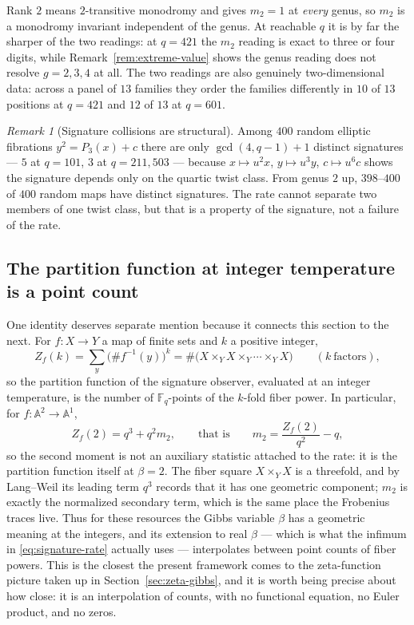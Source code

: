 \documentclass[11pt]{article}
\theoremstyle{definition}
\theoremstyle{plain}
\theoremstyle{remark}
\newtheorem{remark}[definition]{Remark}
\newcommand{\F}{\mathbb F}
\begin{document}
Rank \(2\) means \(2\)-transitive monodromy and gives \(m_2=1\) at
\emph{every} genus, so \(m_2\) is a monodromy invariant independent of the
genus.  At reachable \(q\) it is by far the sharper of the two readings: at
\(q=421\) the \(m_2\) reading is exact to three or four digits, while
Remark~\ref{rem:extreme-value} shows the genus reading does not resolve
\(g=2,3,4\) at all.  The two readings are also genuinely two-dimensional data:
across a panel of \(13\) families they order the families differently in \(10\)
of \(13\) positions at \(q=421\) and \(12\) of \(13\) at \(q=601\).

\begin{remark}[Signature collisions are structural]
Among \(400\) random elliptic fibrations \(y^2=P_3(x)+c\) there are only
\(\gcd(4,q-1)+1\) distinct signatures --- \(5\) at \(q=101\), \(3\) at
\(q=211,503\) --- because \(x\mapsto u^2x\), \(y\mapsto u^3y\),
\(c\mapsto u^6c\) shows the signature depends only on the quartic twist class.
From genus \(2\) up, \(398\)--\(400\) of \(400\) random maps have distinct
signatures.  The rate cannot separate two members of one twist class, but that
is a property of the signature, not a failure of the rate.
\end{remark}

\subsection{The partition function at integer temperature is a point count}
\label{sub:fiber-powers}

One identity deserves separate mention because it connects this section to the
next.  For \(f:X\to Y\) a map of finite sets and \(k\) a positive integer,
\begin{equation}
  Z_f(k)=\sum_{y}\bigl(\#f^{-1}(y)\bigr)^k
  =\#\bigl(X\times_YX\times_Y\cdots\times_YX\bigr)
  \qquad(k\ \text{factors}),
  \label{eq:fiber-power}
\end{equation}
so the partition function of the signature observer, evaluated at an integer
temperature, is the number of \(\F_q\)-points of the \(k\)-fold fiber power.
In particular, for \(f:\mathbb A^2\to\mathbb A^1\),
\[
  Z_f(2)=q^3+q^2m_2,
  \qquad\text{that is}\qquad
  m_2=\frac{Z_f(2)}{q^2}-q,
\]
so the second moment is not an auxiliary statistic attached to the rate: it is
the partition function itself at \(\beta=2\).  The fiber square \(X\times_YX\)
is a threefold, and by Lang--Weil its leading term \(q^3\) records that it has
one geometric component; \(m_2\) is exactly the normalized secondary term, which
is the same place the Frobenius traces live.  Thus for these resources the Gibbs
variable \(\beta\) has a geometric meaning at the integers, and its extension to
real \(\beta\) --- which is what the infimum in \eqref{eq:signature-rate}
actually uses --- interpolates between point counts of fiber powers.  This is the
closest the present framework comes to the zeta-function picture taken up in
Section~\ref{sec:zeta-gibbs}, and it is worth being precise about how close: it
is an interpolation of counts, with no functional equation, no Euler product,
and no zeros.
\end{document}

